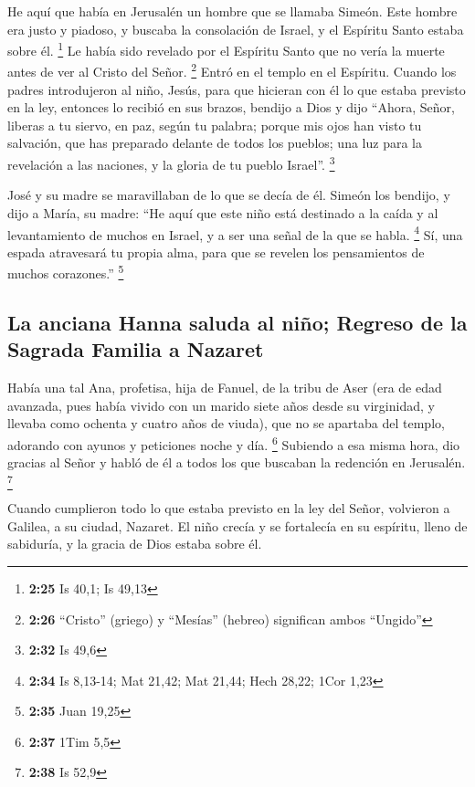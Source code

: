  He aquí que había en Jerusalén un hombre que se llamaba
Simeón. Este hombre era justo y piadoso, y buscaba la consolación de
Israel, y el Espíritu Santo estaba sobre él. \footnote{\textbf{2:25} Is
  40,1; Is 49,13}  Le había sido revelado por el Espíritu
Santo que no vería la muerte antes de ver al Cristo del Señor.
\footnote{\textbf{2:26} ``Cristo'' (griego) y ``Mesías'' (hebreo)
  significan ambos ``Ungido''}  Entró en el templo en el
Espíritu. Cuando los padres introdujeron al niño, Jesús, para que
hicieran con él lo que estaba previsto en la ley, 
entonces lo recibió en sus brazos, bendijo a Dios y dijo 
``Ahora, Señor, liberas a tu siervo, en paz, según tu palabra;
 porque mis ojos han visto tu salvación, 
que has preparado delante de todos los pueblos;  una luz
para la revelación a las naciones, y la gloria de tu pueblo Israel''.
\footnote{\textbf{2:32} Is 49,6}

 José y su madre se maravillaban de lo que se decía de
él.  Simeón los bendijo, y dijo a María, su madre: ``He
aquí que este niño está destinado a la caída y al levantamiento de
muchos en Israel, y a ser una señal de la que se habla. \footnote{\textbf{2:34}
  Is 8,13-14; Mat 21,42; Mat 21,44; Hech 28,22; 1Cor 1,23}
 Sí, una espada atravesará tu propia alma, para que se
revelen los pensamientos de muchos corazones.'' \footnote{\textbf{2:35}
  Juan 19,25}

\hypertarget{la-anciana-hanna-saluda-al-niuxf1o-regreso-de-la-sagrada-familia-a-nazaret}{%
\subsection{La anciana Hanna saluda al niño; Regreso de la Sagrada
Familia a
Nazaret}\label{la-anciana-hanna-saluda-al-niuxf1o-regreso-de-la-sagrada-familia-a-nazaret}}

 Había una tal Ana, profetisa, hija de Fanuel, de la
tribu de Aser (era de edad avanzada, pues había vivido con un marido
siete años desde su virginidad,  y llevaba como ochenta y
cuatro años de viuda), que no se apartaba del templo, adorando con
ayunos y peticiones noche y día. \footnote{\textbf{2:37} 1Tim 5,5}
 Subiendo a esa misma hora, dio gracias al Señor y habló
de él a todos los que buscaban la redención en Jerusalén. \footnote{\textbf{2:38}
  Is 52,9}

 Cuando cumplieron todo lo que estaba previsto en la ley
del Señor, volvieron a Galilea, a su ciudad, Nazaret.  El
niño crecía y se fortalecía en su espíritu, lleno de sabiduría, y la
gracia de Dios estaba sobre él.

